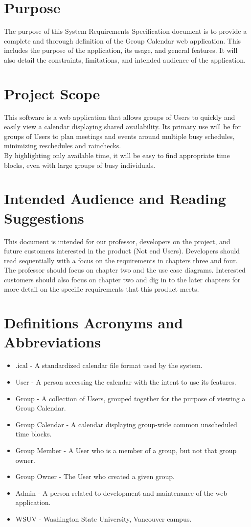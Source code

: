 \documentclass{scrreprt}
\begin{document}
\section{Purpose}

The purpose of this System Requirements Specification document is to
provide a complete and thorough definition of the Group Calendar web application.
This includes the purpose of the application, its usage, and general features. It will
also detail the constraints, limitations, and intended audience of the application.


\section{Project Scope}

This software is a web application that allows groups of Users to quickly and easily 
view a calendar displaying shared availability. Its primary use will be for groups of 
Users to plan meetings and events around multiple busy schedules, minimizing 
reschedules and rainchecks.
\\By highlighting only available time, it will be easy to find
appropriate time blocks, even with large groups of busy individuals.


\section{Intended Audience and Reading Suggestions}

This document is intended for our professor, developers on the project, and
future customers interested in the product (Not end Users). Developers should
read sequentially with a focus on the requirements in chapters three and four.
The professor should focus on chapter two and the use case diagrams. Interested
customers should also focus on chapter two and dig in to the later chapters for
more detail on the specific requirements that this product meets.


\section{Definitions Acronyms and Abbreviations}
\begin{itemize}
\item .ical - A standardized calendar file format used by the system.
\item User - A person accessing the calendar with the intent to use its 
features.
\item Group - A collection of Users, grouped together for the purpose of viewing
a Group Calendar.
\item Group Calendar - A calendar displaying group-wide common unscheduled time blocks.
\item Group Member - A User who is a member of a group, but not that group owner.
\item Group Owner - The User who created a given group.
\item Admin - A person related to development and maintenance of the web application.
\item WSUV - Washington State University, Vancouver campus.
\end{itemize}
\end{document}
